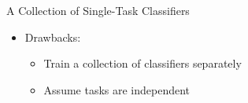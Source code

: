 \documentclass[first=dgreen,second=purple,logo=yellowexc]{aaltoslides}
\begin{document}
\begin{frame}{A Collection of Single-Task Classifiers}
\begin{itemize}
\begin{align*}
{\begin{array}{cccc}
    \end{array} 
    \right]}
    \only<4>{
    &Y =& \left[ 
    \begin{array}{cccc} 
    \ldots&\ldots&y_{1j} &\ldots\\ 
    \vdots&\vdots&\ddots&\vdots\\ 
    \ldots&\ldots&y_{ij} &\ldots\\ 
    \vdots&\vdots&\ddots&\vdots\\ 
    \ldots&\ldots&y_{nj} &\ldots\\ 
    \end{array} 
    \right]}
    \only<5>{
    &Y =& \left[ 
    \begin{array}{cccc} 
    \ldots&\ldots&\ldots&y_{1T}\\ 
    \vdots&\vdots&\ddots&\vdots\\ 
    \ldots&\ldots&\ldots&y_{jT}\\
    \vdots&\vdots&\ddots&\vdots\\ 
    \ldots&\ldots&\ldots&y_{nT}\\
    \end{array} 
    \right]}
    \end{align*}
    \begin{align*}
    \only<1>{\{y_1,y_2,\cdots,y_T\} & =F(x)}%
    \only<2>{\{y_1,\cdots,\cdots,\cdots\} & = \{\mathbf{f_1(x)},\cdots,\cdots,\cdots\}}
    \only<3>{\{\cdots,y_2,\cdots,\cdots\} & = \{\cdots,\mathbf{f_2(x)},\cdots,\cdots\}}
    \only<4>{\{\cdots,\cdots,y_j,\cdots\} & = \{\cdots,\cdots,\mathbf{f_j(x)}\cdots\}}
    \only<5>{\{\cdots,\cdots,\cdots,y_T\} & = \{\cdots,\cdots,\cdots,\mathbf{f_T(x)}\}}
    \end{align*}
    \item Drawbacks:
    \begin{itemize}
        \item Train a collection of classifiers separately
        \item Assume tasks are independent 
    \end{itemize}
\end{itemize}
\end{frame}
\end{document}
